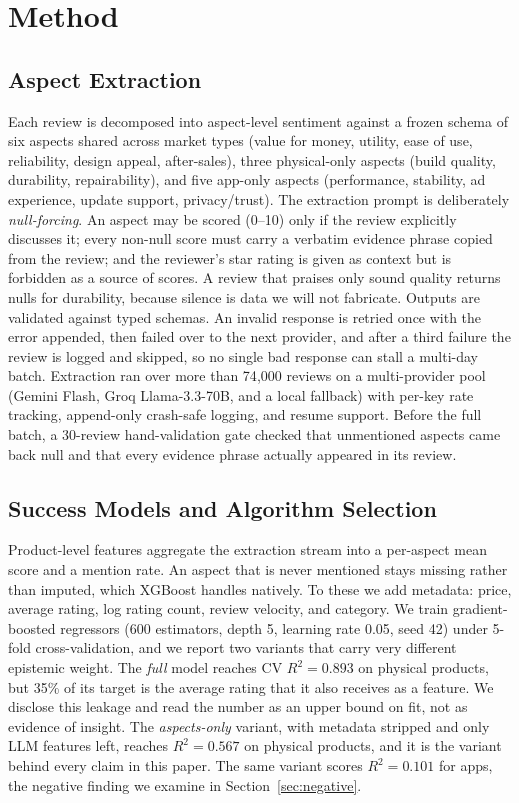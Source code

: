 \documentclass[journal]{IEEEtran}
\begin{document}
\section{Method}
\label{sec:method}

\subsection{Aspect Extraction}
Each review is decomposed into aspect-level sentiment against a frozen schema of six aspects shared across market types (value for money, utility, ease of use, reliability, design appeal, after-sales), three physical-only aspects (build quality, durability, repairability), and five app-only aspects (performance, stability, ad experience, update support, privacy/trust). The extraction prompt is deliberately \emph{null-forcing}. An aspect may be scored (0--10) only if the review explicitly discusses it; every non-null score must carry a verbatim evidence phrase copied from the review; and the reviewer's star rating is given as context but is forbidden as a source of scores. A review that praises only sound quality returns nulls for durability, because silence is data we will not fabricate. Outputs are validated against typed schemas. An invalid response is retried once with the error appended, then failed over to the next provider, and after a third failure the review is logged and skipped, so no single bad response can stall a multi-day batch. Extraction ran over more than 74{,}000 reviews on a multi-provider pool (Gemini Flash, Groq Llama-3.3-70B, and a local fallback) with per-key rate tracking, append-only crash-safe logging, and resume support. Before the full batch, a 30-review hand-validation gate checked that unmentioned aspects came back null and that every evidence phrase actually appeared in its review.

\subsection{Success Models and Algorithm Selection}
\label{sec:models}
Product-level features aggregate the extraction stream into a per-aspect mean score and a mention rate. An aspect that is never mentioned stays missing rather than imputed, which XGBoost \cite{chen2016xgboost} handles natively. To these we add metadata: price, average rating, log rating count, review velocity, and category. We train gradient-boosted regressors (600 estimators, depth 5, learning rate 0.05, seed 42) under 5-fold cross-validation, and we report two variants that carry very different epistemic weight. The \emph{full} model reaches CV $R^2 = 0.893$ on physical products, but 35\% of its target is the average rating that it also receives as a feature. We disclose this leakage and read the number as an upper bound on fit, not as evidence of insight. The \emph{aspects-only} variant, with metadata stripped and only LLM features left, reaches $R^2 = 0.567$ on physical products, and it is the variant behind every claim in this paper. The same variant scores $R^2 = 0.101$ for apps, the negative finding we examine in Section~\ref{sec:negative}.
\end{document}
